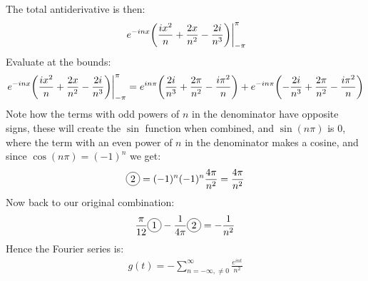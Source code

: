 \documentclass[12pt]{article}
\newcommand*\circled[1]{\tikz[baseline=(char.base)]{
            \node[shape=circle,draw,inner sep=2pt] (char) {#1};}}
\begin{document}
The total antiderivative is then:
\begin{align*}
  \eval{e^{-inx}\qty(\frac{ix^2}{n}+\frac{2x}{n^2}-\frac{2i}{n^3})}_{-\pi}^\pi
\end{align*}
Evaluate at the bounds:
\begin{align*}
  \eval{e^{-inx}\qty(\frac{ix^2}{n}+\frac{2x}{n^2}-\frac{2i}{n^3})}_{-\pi}^\pi
  =e^{in\pi}\qty(\frac{2i}{n^3}+\frac{2\pi}{n^2}-\frac{i\pi^2}{n})
  +e^{-in\pi}\qty(-\frac{2i}{n^3}+\frac{2\pi}{n^2}-\frac{i\pi^2}{n})
\end{align*}
Note how the terms with odd powers of $n$ in the denominator have opposite signs, these will create the $\sin$ function when combined, and $\sin(n\pi)$ is $0$, where the term with an even power of $n$ in the denominator makes a cosine, and since $\cos(n\pi)=(-1)^n$ we get:
\begin{align*}
  \circled{2}=(-1)^n(-1)^n\frac{4\pi}{n^2}=\frac{4\pi}{n^2}
\end{align*}
Now back to our original combination:
\begin{align*}
  \frac\pi{12}\circled{1}-\frac1{4\pi}\circled{2}=-\frac{1}{n^2}
\end{align*}
Hence the Fourier series is:
\begin{align}
  \boxed{
    g(t)=-\sum_{n=-\infty,\neq0}^\infty\frac{e^{int}}{n^2}
  }
\end{align}
\end{document}
